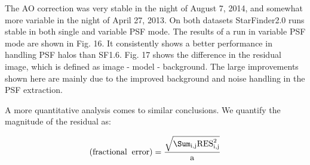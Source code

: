 The AO correction was very stable in the night of August 7, 2014, and somewhat more variable in the night of April 27, 2013. On both datasets StarFinder2.0 runs stable in both single and variable PSF mode. The results of a run in variable PSF mode are shown in Fig. 16. It consistently shows a better performance in handling PSF halos than SF1.6. Fig. 17 shows the difference in the residual image, which is defined as image - model - background. The large improvements shown here are mainly due to the improved background and noise handling in the PSF extraction.

A more quantitative analysis comes to similar conclusions. We quantify the magnitude of the residual as:

\begin{equation}
\rm(fractional \; \; error) = \frac{\sqrt{\Sum_{i,j}\rm{RES}^2_{i,j}}}{a}
\end{equation}
  
  
  
  
  